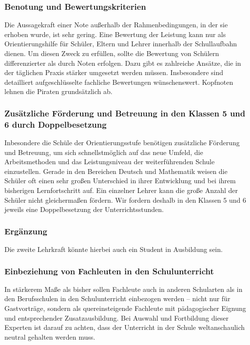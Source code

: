
\subsubsection{Benotung und Bewertungskriterien}
\abstimmung 
Die Aussagekraft einer Note außerhalb der Rahmenbedingungen, in der sie erhoben wurde, ist sehr gering. Eine Bewertung der Leistung kann nur als Orientierungshilfe für Schüler, Eltern und Lehrer innerhalb der Schullaufbahn dienen. Um diesen Zweck zu erfüllen, sollte die Bewertung von Schülern differenzierter als durch Noten erfolgen. Dazu gibt es zahlreiche Ansätze, die in der täglichen Praxis stärker umgesetzt werden müssen. Insbesondere sind detailliert aufgeschlüsselte fachliche Bewertungen wünschenswert. Kopfnoten lehnen die Piraten grundsätzlich ab.
 

\subsubsection{Zusätzliche Förderung und Betreuung in den Klassen 5 und 6 durch Doppelbesetzung}
\abstimmung 
Inbesondere die Schüle der Orientierungsstufe benötigen zusätzliche Förderung und Betreuung, um sich schnellstmöglich auf das neue Umfeld, die Arbeitsmethoden und das Leistungsniveau der weiterführenden Schule einzustellen. Gerade in den Bereichen Deutsch und Mathematik weisen die Schüler oft einen sehr großen Unterschied in ihrer Entwicklung und bei ihrem bisherigen Lernfortschritt auf. Ein einzelner Lehrer kann die große Anzahl der Schüler nicht gleichermaßen fördern. Wir fordern deshalb in den Klassen 5 und 6 jeweils eine Doppelbesetzung der Unterrichtsstunden.

\subsubsection{Ergänzung}
\abstimmung 
Die zweite Lehrkraft könnte hierbei auch ein Student in Ausbildung sein.
 

\subsubsection{Einbeziehung von Fachleuten in den Schulunterricht}
\abstimmung 
In stärkerem Maße als bisher sollen Fachleute auch in anderen Schularten als in den Berufsschulen in den Schulunterricht einbezogen werden – nicht nur für Gastvorträge, sondern als quereinsteigende Fachleute mit pädagogischer Eignung und entsprechender Zusatzausbildung. Bei Auswahl und Fortbildung dieser Experten ist darauf zu achten, dass der Unterricht in der Schule weltanschaulich neutral gehalten werden muss.

